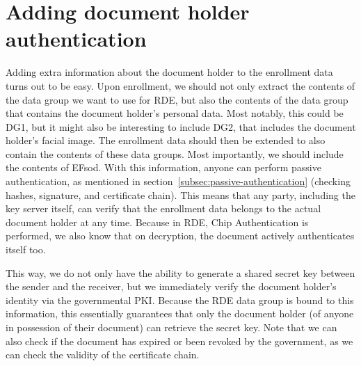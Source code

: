 \section{Adding document holder authentication}\label{sec:adding-document-holder-authentication}
Adding extra information about the document holder to the enrollment data turns out to be easy.
Upon enrollment, we should not only extract the contents of the data group we want to use for RDE, but also the contents of the data group that contains the document holder's personal data.
Most notably, this could be DG1, but it might also be interesting to include DG2, that includes the document holder's facial image.
The enrollment data should then be extended to also contain the contents of these data groups.
Most importantly, we should include the contents of EFsod.
With this information, anyone can perform passive authentication, as mentioned in section~\ref{subsec:passive-authentication} (checking hashes, signature, and certificate chain).
This means that any party, including the key server itself, can verify that the enrollment data belongs to the actual document holder at any time.
Because in RDE, Chip Authentication is performed, we also know that on decryption, the document actively authenticates itself too.

This way, we do not only have the ability to generate a shared secret key between the sender and the receiver, but we immediately verify the document holder's identity via the governmental PKI.
Because the RDE data group is bound to this information, this essentially guarantees that only the document holder (of anyone in possession of their document) can retrieve the secret key.
Note that we can also check if the document has expired or been revoked by the government, as we can check the validity of the certificate chain.

